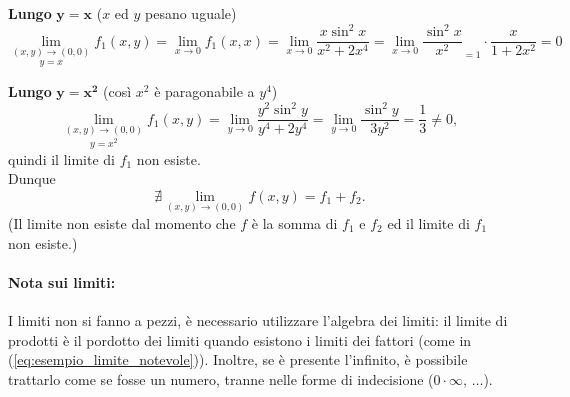 \begin{example}
	\noindent \textbf{Lungo} $\boldsymbol{y=x}$ ($x$ ed $y$ pesano uguale)
	\begin{equation}\label{eq:esempio_limite_notevole}
		\underset{y=x}{\lim\limits_{(x,y)\rightarrow(0,0)}} f_1(x,y) = \lim\limits_{x\rightarrow 0} f_1(x,x) = \lim\limits_{x\rightarrow 0}\frac{x\sin^2x}{x^2+2x^4} = \lim\limits_{x\rightarrow 0}\boxed{\frac{\sin^2x}{x^2}}_{=1}\cdot\frac{x}{1+2x^2}=0
	\end{equation}
	
	\noindent \textbf{Lungo} $\boldsymbol{y=x^2}$ (così $x^2$ è paragonabile a $y^4$)
	\begin{equation*}
		\underset{y=x^2}{\lim\limits_{(x,y)\rightarrow(0,0)}} f_1(x,y) = \lim\limits_{y\rightarrow 0}\frac{y^2\sin^2y}{y^4+2y^4} = \lim\limits_{y\rightarrow 0} \frac{\sin^2y}{3y^2} =\frac{1}{3} \neq 0,
	\end{equation*}
	quindi il limite di $f_1$ non esiste.\\
	Dunque
	\begin{equation*}
		\nexists \lim\limits_{(x,y)\rightarrow(0,0)} f(x,y) = f_1 + f_2.
	\end{equation*}
	(Il limite non esiste dal momento che $f$ è la somma di $f_1$ e $f_2$ ed il limite di $f_1$ non esiste.)
\end{example}

\paragraph{Nota sui limiti:} I limiti non si fanno a pezzi, è necessario utilizzare l'algebra dei limiti: il limite di prodotti è il pordotto dei limiti quando esistono i limiti dei fattori (come in (\ref{eq:esempio_limite_notevole})). Inoltre, se è presente l'infinito, è possibile trattarlo come se fosse un numero, tranne nelle forme di indecisione ($0\cdot\infty,\, \hdots$).

